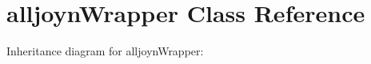 \hypertarget{classalljoynWrapper}{}\section{alljoyn\+Wrapper Class Reference}
\label{classalljoynWrapper}


Inheritance diagram for alljoyn\+Wrapper\+:
